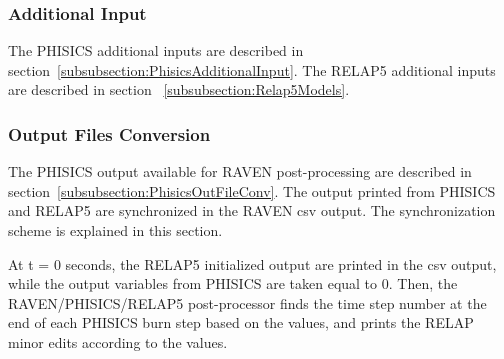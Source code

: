 \subsubsection{Additional Input}
\label{subsubsection:PhisicsRelap5AdditionalInput}
The PHISICS additional inputs are described in section~\ref{subsubsection:PhisicsAdditionalInput}. The RELAP5 additional inputs are described in
section ~\ref{subsubsection:Relap5Models}.
%
\subsubsection{Output Files Conversion}
\label{subsubsection:PhisicsRelap5OutputFileConversion}

The PHISICS output available for RAVEN post-processing are described in section~\ref{subsubsection:PhisicsOutFileConv}.
The output printed from PHISICS and RELAP5 are synchronized in the RAVEN csv output. The synchronization scheme is explained in this section.

At t = 0 seconds, the RELAP5 initialized output are printed in the csv output, while the output variables from PHISICS are taken equal to 0.
Then, the RAVEN/PHISICS/RELAP5 post-processor finds the time step number at the end of each PHISICS
burn step based on the  values, and prints the RELAP minor edits according to the  values.


